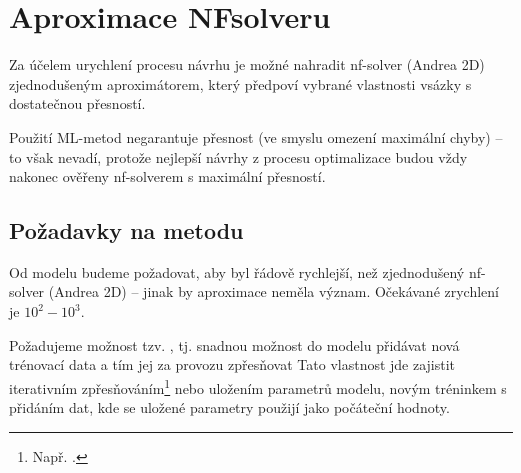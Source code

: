 \chapter{Aproximace NFsolveru}
Za účelem urychlení procesu návrhu je možné nahradit nf-solver (Andrea 2D) 
zjednodušeným aproximátorem, který předpoví vybrané vlastnosti vsázky 
s dostatečnou přesností. 

Použití ML-metod negarantuje přesnost (ve smyslu omezení maximální 
chyby) -- to však nevadí, protože nejlepší návrhy z procesu optimalizace 
budou vždy nakonec ověřeny nf-solverem s maximální přesností.


% 
% 
% 
% 
% 
% 
% 

\section{Požadavky na metodu}
Od modelu budeme požadovat, aby byl řádově rychlejší, než zjednodušený nf-solver (Andrea 2D) -- jinak by aproximace 
neměla význam. Očekávané zrychlení je $10^2 - 10^3$. 

Požadujeme možnost tzv. , tj. snadnou možnost do modelu přidávat nová trénovací data 
a tím jej za provozu zpřesňovat Tato vlastnost 
jde zajistit iterativním zpřesňováním\footnote{Např. .} nebo uložením parametrů modelu, 
novým tréninkem s přidáním dat, kde se uložené parametry použijí jako počáteční hodnoty.



